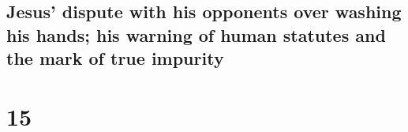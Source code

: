 \begin{paracol}{2}
\switchcolumn
\begin{otherlanguage}{english}

\hypertarget{jesus-dispute-with-his-opponents-over-washing-his-hands-his-warning-of-human-statutes-and-the-mark-of-true-impurity}{%
\subsection{Jesus' dispute with his opponents over washing his hands;
his warning of human statutes and the mark of true
impurity}\label{jesus-dispute-with-his-opponents-over-washing-his-hands-his-warning-of-human-statutes-and-the-mark-of-true-impurity}}

\hypertarget{section-29}{%
\section{15}\label{section-29}}


\end{otherlanguage}
\end{paracol}
